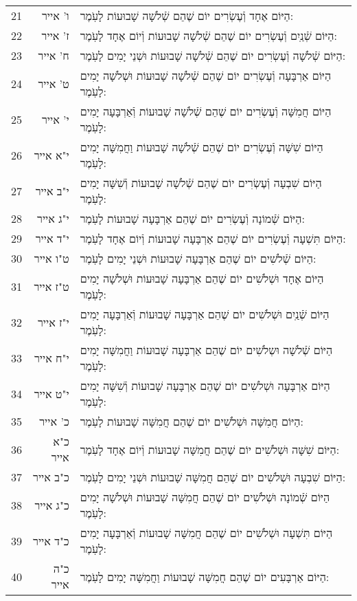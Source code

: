 \documentclass[twoside, openany, parskip=half, 11pt]{book}
\begin{document}
\begin{scriptsize}
\begin{longtable}{ l | r | p{} }
21 & ו' אייר & הַיּוֹם אֶחָד וְֿעֶשְׂרִים יוֹם שֶׁהֵם שְֿׁלֹשָׁה שָׁבוּעוֹת לָעֹֽמֶר: \\
22 & ז' אייר & הַיּוֹם שְֿׁנַֽיִם וְֿעֶשְׂרִים יוֹם שֶׁהֵם שְֿׁלֹשָׁה שָׁבוּעוֹת וְֿיוֹם אֶחָד לָעֹֽמֶר: \\
23 & ח' אייר & הַיּוֹם שְֿׁלֹשָׁה וְֿעֶשְׂרִים יוֹם שֶׁהֵם שְֿׁלֹשָׁה שָׁבוּעוֹת וּשְׁנֵי יָמִים לָעֹֽמֶר: \\
24 & ט' אייר & הַיּוֹם אַרְבָּעָה וְֿעֶשְׂרִים יוֹם שֶׁהֵם שְֿׁלֹשָׁה שָׁבוּעוֹת וּשְׁלֹשָׁה יָמִים לָעֹֽמֶר: \\
25 & י' אייר & הַיּוֹם חֲמִשָּׁה וְֿעֶשְׂרִים יוֹם שֶׁהֵם שְֿׁלֹשָׁה שָׁבוּעוֹת וְֿאַרְבָּעָה יָמִים לָעֹֽמֶר: \\
26 & י"א אייר & הַיּוֹם שִׁשָּׁה וְֿעֶשְׂרִים יוֹם שֶׁהֵם שְֿׁלֹשָׁה שָׁבוּעוֹת וַחֲמִשָּׁה יָמִים לָעֹֽמֶר: \\
27 & י"ב אייר & הַיּוֹם שִׁבְעָה וְֿעֶשְׂרִים יוֹם שֶׁהֵם שְֿׁלֹשָׁה שָׁבוּעוֹת וְֿשִׁשָּׁה יָמִים לָעֹֽמֶר: \\
28 & י"ג אייר & הַיּוֹם שְֿׁמוֹנָה וְֿעֶשְׂרִים יוֹם שֶׁהֵם אַרְבָּעָה שָׁבוּעוֹת לָעֹֽמֶר: \\
29 & י"ד אייר & הַיּוֹם תִּשְׁעָה וְֿעֶשְׂרִים יוֹם שֶׁהֵם אַרְבָּעָה שָׁבוּעוֹת וְֿיוֹם אֶחָד לָעֹֽמֶר: \\
30 & ט"ו אייר & הַיּוֹם שְֿׁלֹשִׁים יוֹם שֶׁהֵם אַרְבָּעָה שָׁבוּעוֹת וּשְׁנֵי יָמִים לָעֹֽמֶר: \\
31 & ט"ז אייר & הַיּוֹם אֶחָד וּשְׁלֹשִׁים יוֹם שֶׁהֵם אַרְבָּעָה שָׁבוּעוֹת וּשְׁלֹשָׁה יָמִים לָעֹֽמֶר: \\
32 & י"ז אייר & הַיּוֹם שְֿׁנַֽיִם וּשְׁלֹשִׁים יוֹם שֶׁהֵם אַרְבָּעָה שָׁבוּעוֹת וְֿאַרְבָּעָה יָמִים לָעֹֽמֶר: \\
33 & י"ח אייר & הַיּוֹם שְֿׁלֹשָׁה וּשְלֹשִׁים יוֹם שֶׁהֵם אַרְבָּעָה שָׁבוּעוֹת וַחֲמִשָּׁה יָמִים לָעֹֽמֶר: \\
34 & י"ט אייר & הַיּוֹם אַרְבָּעָה וּשְׁלֹשִׁים יוֹם שֶׁהֵם אַרְבָּעָה שָׁבוּעוֹת וְֿשִׁשָּׁה יָמִים לָעֹֽמֶר: \\
35 & כ' אייר & הַיּוֹם חֲמִשָּׁה וּשְׁלֹשִׁים יוֹם שֶׁהֵם חֲמִשָּׁה שָׁבוּעוֹת לָעֹֽמֶר: \\
36 & כ"א אייר & הַיּוֹם שִׁשָּׁה וּשְׁלֹשִׁים יוֹם שֶׁהֵם חֲמִשָּׁה שָׁבוּעוֹת וְֿיוֹם אֶחָד לָעֹֽמֶר: \\
37 & כ"ב אייר & הַיּוֹם שִׁבְעָה וּשְׁלֹשִׁים יוֹם שֶׁהֵם חֲמִשָּׁה שָׁבוּעוֹת וּשְׁנֵי יָמִים לָעֹֽמֶר: \\
38 & כ"ג אייר & הַיּוֹם שְֿׁמוֹנָה וּשְׁלֹשִׁים יוֹם שֶׁהֵם חֲמִשָּׁה שָׁבוּעוֹת וּשְׁלֹשָׁה יָמִים לָעֹֽמֶר: \\
39 & כ"ד אייר & הַיּוֹם תִּשְׁעָה וּשְׁלֹשִׁים יוֹם שֶׁהֵם חֲמִשָּׁה שָׁבוּעוֹת וְֿאַרְבָּעָה יָמִים לָעֹֽמֶר: \\
40 & כ"ה אייר & הַיּוֹם אַרְבָּעִים יוֹם שֶׁהֵם חֲמִשָּׁה שָׁבוּעוֹת וַחֲמִשָּׁה יָמִים לָעֹֽמֶר: \\

\end{longtable}
\end{scriptsize}
\end{document}
